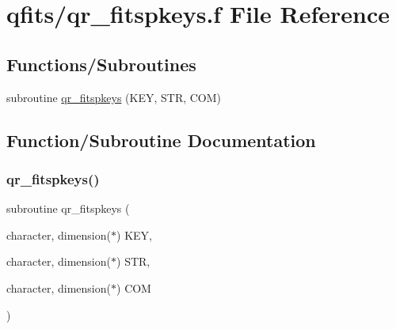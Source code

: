 \hypertarget{qr__fitspkeys_8f}{}\section{qfits/qr\+\_\+fitspkeys.f File Reference}
\label{qr__fitspkeys_8f}
\subsection*{Functions/\+Subroutines}
\begin{DoxyCompactItemize}
\item 
subroutine \hyperlink{qr__fitspkeys_8f_ae474503052458213717d25c365647dc6}{qr\+\_\+fitspkeys} (K\+EY, S\+TR, C\+OM)
\end{DoxyCompactItemize}


\subsection{Function/\+Subroutine Documentation}
\mbox{\label{qr__fitspkeys_8f_ae474503052458213717d25c365647dc6}} 
\subsubsection{\texorpdfstring{qr\+\_\+fitspkeys()}{qr\_fitspkeys()}}
{\footnotesize\ttfamily subroutine qr\+\_\+fitspkeys (\begin{DoxyParamCaption}\item[{character, dimension($\ast$)}]{K\+EY,  }\item[{character, dimension($\ast$)}]{S\+TR,  }\item[{character, dimension($\ast$)}]{C\+OM }\end{DoxyParamCaption})}

